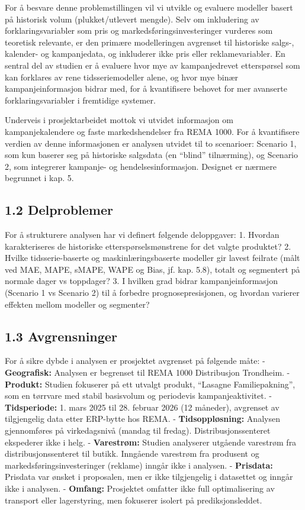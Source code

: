 \documentclass[
  norsk,
  11pt,
  a4paper,
]{article}
\begin{document}
For å besvare denne problemstillingen vil vi utvikle og evaluere
modeller basert på historisk volum (plukket/utlevert mengde). Selv om
inkludering av forklaringsvariabler som pris og
markedsføringsinvesteringer vurderes som teoretisk relevante, er den
primære modelleringen avgrenset til historiske salgs-, kalender- og
kampanjedata, og inkluderer ikke pris eller reklamevariabler. En sentral
del av studien er å evaluere hvor mye av kampanjedrevet etterspørsel som
kan forklares av rene tidsseriemodeller alene, og hvor mye binær
kampanjeinformasjon bidrar med, for å kvantifisere behovet for mer
avanserte forklaringsvariabler i fremtidige systemer.

Underveis i prosjektarbeidet mottok vi utvidet informasjon om
kampanjekalendere og faste markedshendelser fra REMA 1000. For å
kvantifisere verdien av denne informasjonen er analysen utvidet til to
scenarioer: Scenario 1, som kun baserer seg på historiske salgsdata (en
``blind'' tilnærming), og Scenario 2, som integrerer kampanje- og
hendelsesinformasjon. Designet er nærmere begrunnet i kap. 5.

\subsection{1.2 Delproblemer}\label{delproblemer}

For å strukturere analysen har vi definert følgende deloppgaver: 1.
Hvordan karakteriseres de historiske etterspørselsmønstrene for det
valgte produktet? 2. Hvilke tidsserie-baserte og maskinlæringsbaserte
modeller gir lavest feilrate (målt ved MAE, MAPE, sMAPE, WAPE og Bias,
jf. kap. 5.8), totalt og segmentert på normale dager vs toppdager? 3. I
hvilken grad bidrar kampanjeinformasjon (Scenario 1 vs Scenario 2) til å
forbedre prognosepresisjonen, og hvordan varierer effekten mellom
modeller og segmenter?

\subsection{1.3 Avgrensninger}\label{avgrensninger}

For å sikre dybde i analysen er prosjektet avgrenset på følgende måte: -
\textbf{Geografisk:} Analysen er begrenset til REMA 1000 Distribusjon
Trondheim. - \textbf{Produkt:} Studien fokuserer på ett utvalgt produkt,
``Lasagne Familiepakning'', som en tørrvare med stabil basisvolum og
periodevis kampanjeaktivitet. - \textbf{Tidsperiode:} 1. mars 2025 til
28. februar 2026 (12 måneder), avgrenset av tilgjengelig data etter
ERP-bytte hos REMA. - \textbf{Tidsoppløsning:} Analysen gjennomføres på
virkedagsnivå (mandag til fredag). Distribusjonssenteret ekspederer ikke
i helg. - \textbf{Varestrøm:} Studien analyserer utgående varestrøm fra
distribusjonssenteret til butikk. Inngående varestrøm fra produsent og
markedsføringsinvesteringer (reklame) inngår ikke i analysen. -
\textbf{Prisdata:} Prisdata var ønsket i proposalen, men er ikke
tilgjengelig i datasettet og inngår ikke i analysen. - \textbf{Omfang:}
Prosjektet omfatter ikke full optimalisering av transport eller
lagerstyring, men fokuserer isolert på prediksjonsleddet.
\end{document}

